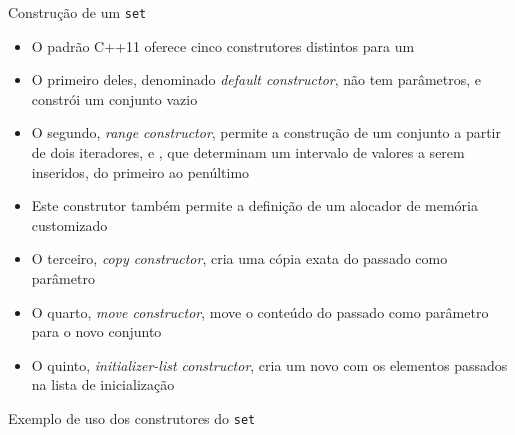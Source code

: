 \begin{frame}[fragile]{Construção de um \texttt{set}}

    \begin{itemize}
        \item O padrão C++11 oferece cinco construtores distintos para um 

        \item O primeiro deles, denominado \textit{default constructor},
                 não tem parâmetros, e constrói um conjunto vazio

        \item O segundo, \textit{range constructor}, permite a construção de um conjunto a partir 
            de dois iteradores,
             e , que determinam um intervalo de valores a 
            serem inseridos, do primeiro ao penúltimo

        \item Este construtor também permite a definição de um alocador de memória customizado

        \item O terceiro, \textit{copy constructor}, cria uma cópia exata do 
            passado como parâmetro

        \item O quarto, \textit{move constructor}, move o conteúdo do  passado
            como parâmetro para o novo conjunto

        \item O quinto, \textit{initializer-list constructor}, cria um novo  com
            os elementos passados na lista de inicialização
    \end{itemize}

\end{frame}

\begin{frame}[fragile]{Exemplo de uso dos construtores do \texttt{set}}


\end{frame}
